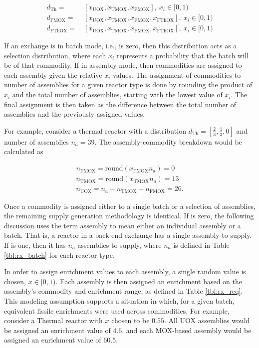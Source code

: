 \begin{equation}\label{eqn:assemdist}
\begin{split}
d_{\text{Th}} = & \:
[x_{\text{UOX}}, x_{\text{TMOX}}, x_{\text{FMOX}}], \: x_i \in [0, 1) \\
d_{\text{FMOX}} = & \:
[x_{\text{UOX}}, x_{\text{TMOX}}, x_{\text{FMOX}}, x_{\text{FThOX}}], \: x_i \in [0, 1) \\
d_{\text{FThOX}} = & \:
[x_{\text{UOX}}, x_{\text{TMOX}}, x_{\text{FMOX}}, x_{\text{FThOX}}], \: x_i \in [0, 1) 
\end{split}
\end{equation}

If an exchange is in batch mode, i.e., \frx is zero, then this distribution
acts as a selection distribution, where each $x_i$ represents a probability that
the batch will be of that commodity. If in assembly mode, then commodities are
assigned to each assembly given the relative $x_i$ values.  The assignment of
commodities to number of assemblies for a given reactor type is done by rounding
the product of $x_i$ and the total number of assemblies, starting with the
lowest value of $x_i$. The final assignment is then taken as the difference
between the total number of assemblies and the previously assigned values.

For example, consider a thermal reactor with a distribution $d_{\text{Th}} =
[\frac{2}{3}, \frac{1}{3}, 0]$ and number of assemblies $n_a = 39$. The
assembly-commodity breakdown would be calculated as

\begin{gather*}
n_{\text{FMOX}} = \text{round}(x_{\text{FMOX}} n_a) = 0 \\
n_{\text{TMOX}} = \text{round}(x_{\text{TMOX}} n_a) = 13 \\
n_{\text{UOX}} = n_a - n_{\text{TMOX}} - n_{\text{FMOX}} = 26.
\end{gather*}

Once a commodity is assigned either to a single batch or a selection of
assemblies, the remaining supply generation methodology is identical. If \frx is
zero, the following discussion uses the term assembly to mean either an
individual assembly or a batch. That is, a reactor in a back-end exchange has a
single assembly to supply. If \frx is one, then it has $n_a$ assemblies to
supply, where $n_a$ is defined in Table \ref{tbl:rx_batch} for each reactor
type.

In order to assign enrichment values to each assembly, a single random value is
chosen, $x \in [0, 1)$. Each assembly is then assigned an enrichment based on
  the assembly's commodity and enrichment range, as defined in Table
  \ref{tbl:rx_req}. This modeling assumption supports a situation in which, for
  a given batch, equivalent fissile enrichments were used across
  commodities. For example, consider a Thermal reactor with $x$ chosen to be
  $0.55$. All UOX assemblies would be assigned an enrichment value of $4.6$, and
  each MOX-based assembly would be assigned an enrichment value of $60.5$.

